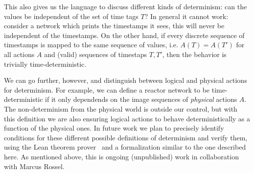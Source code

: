 This also gives us the language to discuss different kinds of determinism: can the values be independent of the set of time tags $T$?
In general it cannot work: consider a network which prints the timestamps it sees, this will never be independent of the timestamps.
On the other hand, if every discrete sequence of timestamps is mapped to the same sequence of values, i.e. $A(T) = A(T')$ for all actions $A$ and (valid) sequences of timestaps $T, T'$, then the behavior is trivially time-deterministic.

We can go further, however, and distinguish between logical and physical actions for determinism. 
For example, we can define a reactor network to be time-deterministic if it only dependends on the image sequences of \emph{physical} actions $A$.
The non-determinism from the physical world is outside our control, but with this definition we are also ensuring logical actions to behave deterministically as a function of the physical ones. 
In future work we plan to precisely identify conditions for these different possible definitions of determinism and verify them, using the Lean theorem prover~\cite{lean} and a formalization similar to the one described here.
As mentioned above, this is ongoing (unpublished) work in collaboration with Marcus Rossel.